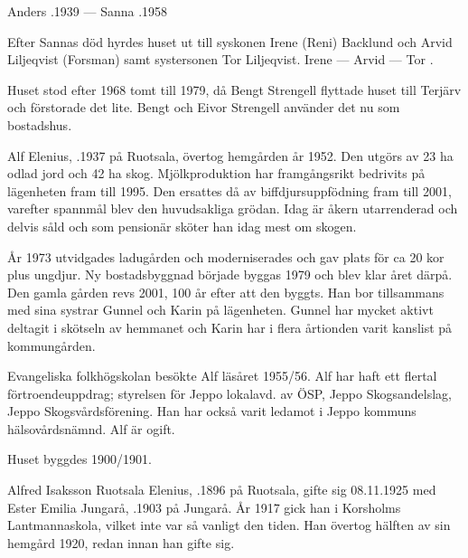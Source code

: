 Anders .1939  ---  Sanna .1958

Efter Sannas död hyrdes huset ut till syskonen Irene (Reni) Backlund och Arvid Liljeqvist (Forsman) samt systersonen Tor Liljeqvist. Irene	  ---  Arvid   ---  Tor	.

Huset stod efter 1968 tomt till 1979, då Bengt Strengell flyttade huset till Terjärv och förstorade det lite. Bengt och Eivor Strengell använder det nu som bostadshus.






Alf Elenius, .1937 på Ruotsala, övertog hemgården år 1952. Den utgörs av 23 ha odlad jord och 42 ha skog. Mjölkproduktion har framgångsrikt bedrivits på lägenheten fram till 1995. Den ersattes då av biffdjursuppfödning fram till 2001, varefter spannmål blev den huvudsakliga grödan. Idag är åkern utarrenderad och delvis såld och som pensionär  sköter han idag mest om skogen.

År 1973 utvidgades ladugården och moderniserades och gav plats för ca 20 kor plus ungdjur. Ny bostadsbyggnad började byggas 1979 och blev klar året därpå. Den gamla gården revs 2001, 100 år efter att den byggts. Han bor tillsammans med sina systrar Gunnel och Karin på lägenheten. Gunnel har mycket aktivt deltagit i skötseln av hemmanet och Karin har i flera årtionden varit kanslist på kommungården.

Evangeliska folkhögskolan besökte Alf läsåret 1955/56. Alf har haft ett flertal förtroendeuppdrag; styrelsen för Jeppo lokalavd. av ÖSP, Jeppo Skogsandelslag, Jeppo Skogsvårdsförening. Han har också varit ledamot i Jeppo kommuns hälsovårdsnämnd. Alf är ogift.



Huset byggdes 1900/1901.



Alfred Isaksson Ruotsala Elenius, .1896 på Ruotsala, gifte sig 08.11.1925 med Ester Emilia Jungarå, .1903 på Jungarå. År 1917 gick han i Korsholms Lantmannaskola, vilket inte var så vanligt den tiden. Han övertog hälften av sin hemgård 1920, redan innan han gifte sig.

